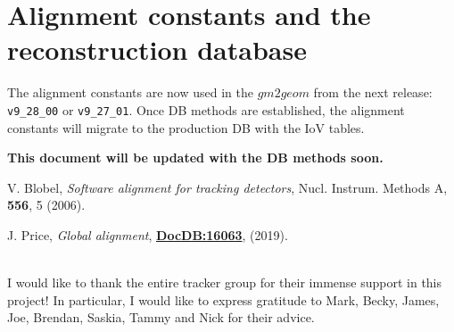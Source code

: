 \documentclass[12pt]{article}
\begin{document}
\section{Alignment constants and the reconstruction database}
The alignment constants are now used in the $gm2geom$ from the next release: \verb!v9_28_00! or \verb!v9_27_01!. Once DB methods are established, the alignment constants will migrate to the production DB with the IoV tables. 

\textbf{This document will be updated with the DB methods soon.}

\begin{thebibliography}{99}

 V. Blobel, \textit{Software alignment for tracking detectors}, Nucl. Instrum. Methods A, \textbf{556}, 5 (2006).

 J. Price, \textit{Global alignment}, \textbf{\href{https://gm2-docdb.fnal.gov/cgi-bin/private/ShowDocument?docid=16063}{DocDB:16063}}, (2019).


\end{thebibliography}

\def\Acknowledgements{
\setlength{\parskip}{0.3cm}\setlength{\parindent}{0.0cm}
     \bigskip\bigskip      {\Large {\bf Acknowledgements}} \bigskip}
\def\speaker#1{{\bf #1:}\ }
\def\endAcknowledgements{}

\Acknowledgements \\
I would like to thank the entire tracker group for their immense support in this project! In particular, I would like to express gratitude to Mark, Becky, James, Joe, Brendan, Saskia, Tammy and Nick for their advice.
\endAcknowledgements
 
\end{document}
